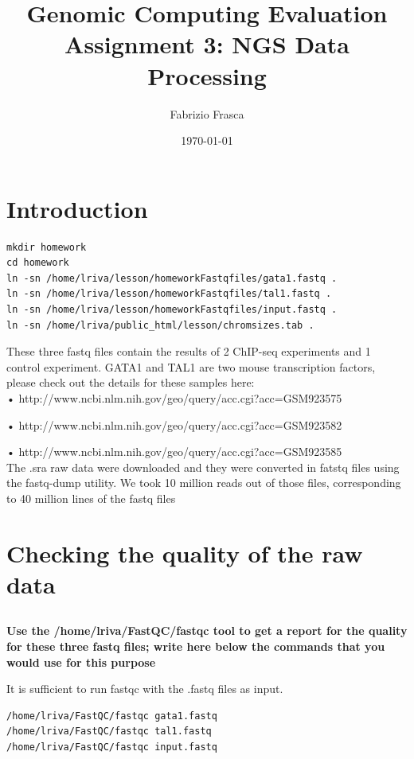 \documentclass[12pt, a4paper]{article}
\title{\textbf{Genomic Computing Evaluation}\\Assignment 3: NGS Data Processing}
\author{Fabrizio Frasca}
\date{\today}
\begin{document}
	
\maketitle
\clearpage

\section*{Introduction}

\begin{verbatim}
mkdir homework
cd homework
ln -sn /home/lriva/lesson/homeworkFastqfiles/gata1.fastq .
ln -sn /home/lriva/lesson/homeworkFastqfiles/tal1.fastq .
ln -sn /home/lriva/lesson/homeworkFastqfiles/input.fastq .
ln -sn /home/lriva/public_html/lesson/chromsizes.tab .
\end{verbatim}

These three fastq files contain the results of 2 ChIP-seq experiments and 1 control experiment.
GATA1 and TAL1 are two mouse transcription factors, please check out the details for these samples here:\\

• http://www.ncbi.nlm.nih.gov/geo/query/acc.cgi?acc=GSM923575

• http://www.ncbi.nlm.nih.gov/geo/query/acc.cgi?acc=GSM923582

• http://www.ncbi.nlm.nih.gov/geo/query/acc.cgi?acc=GSM923585\\


The .sra raw data were downloaded and they were converted in fatstq files using the fastq-dump utility. We took 10 million reads out of those files, corresponding to 40 million lines of the fastq files

\section{Checking the quality of the raw data}

\subsection{}

\textbf{Use the /home/lriva/FastQC/fastqc tool to get a report for the quality for these three fastq files; write here below the commands that you would use for this purpose}

It is sufficient to run fastqc with the .fastq files as input.

\begin{verbatim}
/home/lriva/FastQC/fastqc gata1.fastq
/home/lriva/FastQC/fastqc tal1.fastq
/home/lriva/FastQC/fastqc input.fastq
\end{verbatim}
\end{document}
